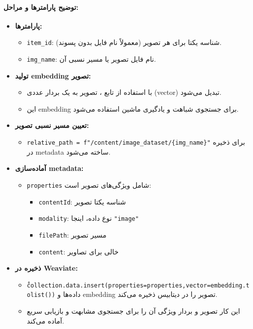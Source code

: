 \documentclass{article}
\begin{document}
\paragraph{توضیح پارامترها و مراحل:}
\begin{itemize}
    \item \textbf{پارامترها:}
    \begin{itemize}
        \item \texttt{item\_id}: شناسه یکتا برای هر تصویر (معمولاً نام فایل بدون پسوند).
        \item \texttt{img\_name}: نام فایل تصویر یا مسیر نسبی آن.
    \end{itemize}
    \item \textbf{تولید embedding تصویر:} 
    \begin{itemize}
        \item با استفاده از تابع \texttt{}، تصویر به یک بردار عددی (vector) تبدیل می‌شود.
        \item این embedding برای جستجوی شباهت و یادگیری ماشین استفاده می‌شود.
    \end{itemize}
    \item \textbf{تعیین مسیر نسبی تصویر:} 
    \begin{itemize}
        \item \texttt{relative\_path = f"/content/image\_dataset/\{img\_name\}"} برای ذخیره در metadata ساخته می‌شود.
    \end{itemize}
    \item \textbf{آماده‌سازی metadata:}
    \begin{itemize}
        \item \texttt{properties} شامل ویژگی‌های تصویر است:
        \begin{itemize}
            \item \texttt{contentId}: شناسه یکتا تصویر
            \item \texttt{modality}: نوع داده، اینجا \texttt{"image"}
            \item \texttt{filePath}: مسیر تصویر
            \item \texttt{content}: خالی برای تصاویر
        \end{itemize}
    \end{itemize}
    \item \textbf{ذخیره در Weaviate:}
    \begin{itemize}
        \item \texttt{\r{collection.data.insert(properties=properties,vector=embedding.tolist())}} داده‌ها و embedding تصویر را در دیتابیس ذخیره می‌کند.
        \item این کار تصویر و بردار ویژگی آن را برای جستجوی مشابهت و بازیابی سریع آماده می‌کند.
    \end{itemize}
\end{itemize}
\end{document}
